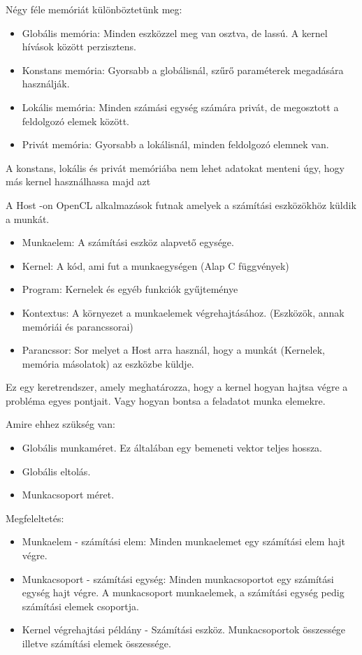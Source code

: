 Négy féle memóriát különböztetünk meg:
\begin{itemize}
\item Globális memória: Minden eszközzel meg van osztva, de lassú. A kernel hívások között perzisztens. 
\item Konstans memória: Gyorsabb a globálisnál, szűrő paraméterek megadására használják.
\item Lokális memória: Minden számási egység számára privát, de megosztott a feldolgozó elemek között.
\item Privát memória: Gyorsabb a lokálisnál, minden feldolgozó elemnek van.
\end{itemize} 
A konstans, lokális és privát memóriába nem lehet adatokat menteni úgy, hogy más kernel használhassa majd azt


A Host -on OpenCL alkalmazások futnak amelyek a számítási eszközökhöz küldik a munkát.
\begin{itemize}
\item Munkaelem: A számítási eszköz alapvető egysége.
\item Kernel: A kód, ami fut a munkaegységen  (Alap C függvények)
\item Program: Kernelek és egyéb funkciók gyűjteménye
\item Kontextus: A környezet a munkaelemek végrehajtásához. (Eszközök, annak memóriái és parancssorai)
\item Parancssor: Sor melyet a Host arra használ, hogy a munkát (Kernelek, memória másolatok) az eszközbe küldje.
\end{itemize}

Ez egy keretrendszer, amely meghatározza, hogy a kernel hogyan hajtsa végre a probléma egyes pontjait. Vagy hogyan bontsa a feladatot munka elemekre.

Amire ehhez szükség van:
\begin{itemize}
\item Globális munkaméret. Ez általában egy bemeneti vektor teljes hossza.
\item Globális eltolás.
\item Munkacsoport méret.
\end{itemize}

Megfeleltetés:
\begin{itemize}
\item Munkaelem - számítási elem: Minden munkaelemet egy számítási elem hajt végre.
\item Munkacsoport - számítási egység: Minden munkacsoportot egy számítási egység hajt végre. A munkacsoport munkaelemek, a számítási egység pedig számítási elemek csoportja.
\item Kernel végrehajtási példány - Számítási eszköz. Munkacsoportok összessége illetve számítási elemek összessége. 
\end{itemize}

